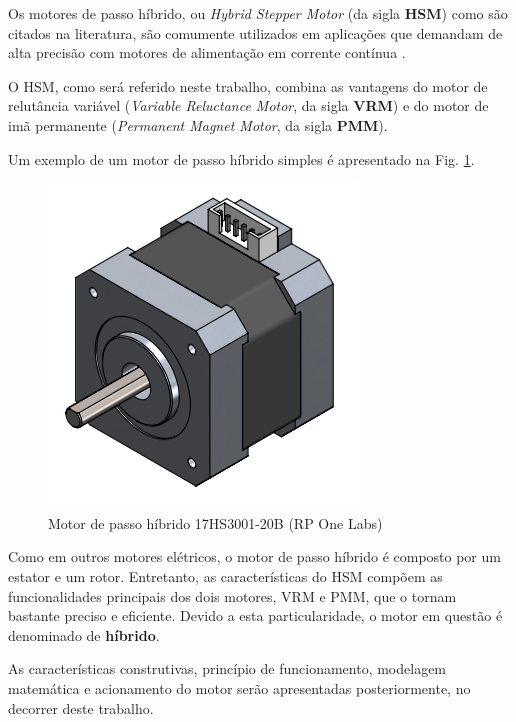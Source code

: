 Os motores de passo híbrido, ou \textit{Hybrid Stepper Motor} (da sigla \textbf{HSM}) como são citados na literatura, são comumente utilizados em aplicações que demandam de alta precisão com motores de alimentação em corrente contínua \cite{ieeeRusso}.
	
	O HSM, como será referido neste trabalho, combina as vantagens do motor de relutância variável (\textit{Variable Reluctance Motor}, da sigla \textbf{VRM}) e do motor de imã permanente (\textit{Permanent Magnet Motor}, da sigla \textbf{PMM}).
	
	Um exemplo de um motor de passo híbrido simples é apresentado na Fig. \ref{HSMgrafico}.
	
	\begin{figure}[H]
		\centering
		\includegraphics[scale=0.5]{Images/HSMmodel.png}
		\caption{Motor de passo híbrido 17HS3001-20B (RP One Labs)}
		\label{HSMgrafico}
	\end{figure}  
	
	Como em outros motores elétricos, o motor de passo híbrido é composto por um estator e um rotor. Entretanto, as características do HSM compõem as funcionalidades principais dos dois motores, VRM e PMM, que o tornam bastante preciso e eficiente. Devido a esta particularidade, o motor em questão é denominado de \textbf{híbrido}.
	
	As características construtivas, princípio de funcionamento, modelagem matemática e acionamento do motor serão apresentadas posteriormente, no decorrer deste trabalho. 